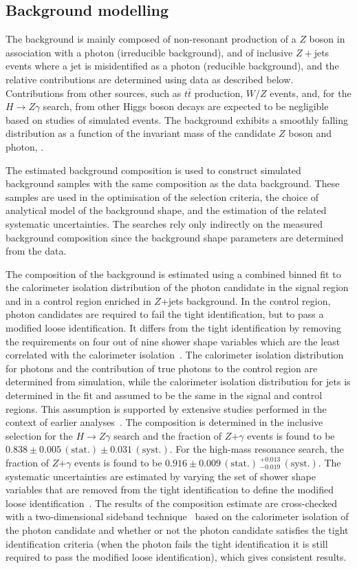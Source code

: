 \subsection{Background modelling}
\label{sec:bckgModel}
The background is mainly composed of non-resonant production of a $Z$ boson in association with
a photon (irreducible background), and of inclusive $Z+$jets events where a jet is misidentified as 
a photon (reducible background), and the relative contributions are determined using data as described
below. Contributions from other sources, such as $t\bar{t}$ production, $W/Z$ events, and, 
for the
$H\to Z\gamma$ search, from other Higgs 
boson decays are expected to be negligible based on studies of simulated events. 
The background exhibits a smoothly falling distribution 
as a function of the invariant mass of the candidate $Z$ boson and photon, \mzg. 

The estimated background composition is used to construct simulated background
samples with the same composition as the data background.
These samples are used in the optimisation
of the selection criteria, the choice of analytical model of the
background shape, and the estimation of the related systematic uncertainties.
The searches rely 
only indirectly on the measured background composition 
since the background shape parameters are determined from the data.

The composition of the background is estimated using a combined binned fit to the calorimeter isolation 
distribution of the photon candidate in the signal region and in a control region enriched in
$Z$+jets background. In the control region, 
photon candidates are required to fail the tight identification, but to pass a modified
loose identification. It differs from the tight identification by removing the requirements on four 
out of nine 
shower shape variables which are the least correlated with the calorimeter isolation~\cite{Aad:2010sp}.
The calorimeter isolation distribution for photons and the contribution of true photons to the control 
region are determined from simulation, 
while the calorimeter isolation distribution for jets is determined 
in the fit and assumed to be the same in the signal and 
control regions. This assumption is supported by extensive studies performed in the context
of earlier analyses~\cite{Aad:2010sp}. The composition is determined in the inclusive 
selection for the $H\to Z\gamma$ search and the fraction of $Z$$+$$\gamma$
events is found to be $0.838\pm 0.005\,\mathrm{(stat.)} \pm 0.031\,\mathrm{(syst.)}$. For the 
high-mass resonance search, the fraction of
$Z$$+$$\gamma$ events is found to be $0.916\pm 0.009\,\mathrm{(stat.)}\,^{+0.013}_{-0.019} 
\,\mathrm{(syst.)}$. 
The systematic uncertainties are estimated by
varying the set of shower shape variables that are removed from the tight identification to
define the modified loose identification~\cite{Aad:2010sp}.
The results of the composition estimate are cross-checked with a
two-dimensional sideband technique~\cite{Aad:2010sp} based on the calorimeter isolation of the photon
candidate and whether or not the photon candidate satisfies the tight identification criteria
(when the photon fails the tight identification it is still required to pass the modified
loose identification), which gives consistent results.

